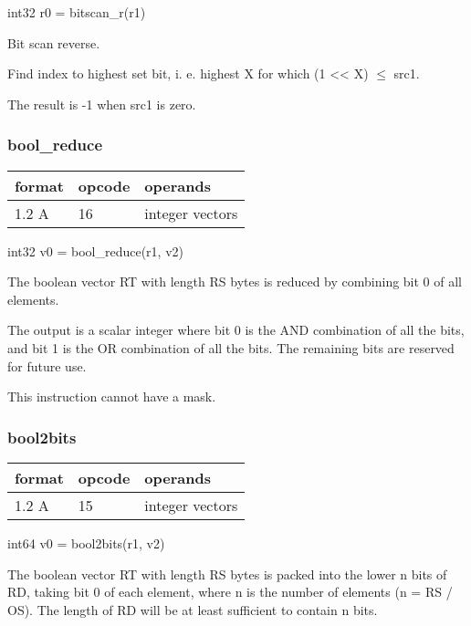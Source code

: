 \documentclass[forwardcom.tex]{subfiles}
\begin{document}
int32 r0 = bitscan\_r(r1)
\vspace{2mm}

Bit scan reverse. 
\vspace{2mm}

Find index to highest set bit, i. e. highest X for which (1 \textless\textless{} X) $\leq$ src1.
\vspace{2mm}

The result is -1 when src1 is zero.

\subsubsection{bool\_reduce}
\label{table:boolReduceInstruction}
\begin{tabular}{|p{12mm}|p{12mm}|p{110mm}|}
\hline
\bfseries format & \bfseries opcode & \bfseries operands \\ \hline
1.2 A & 16 & integer vectors \\ \hline
\end{tabular}
\vspace{2mm}

int32 v0 = bool\_reduce(r1, v2)
\vspace{2mm}

The boolean vector RT with length RS bytes is reduced by combining bit 0 of all elements.

The output is a scalar integer where bit 0 is the AND combination of all the bits, and bit
1 is the OR combination of all the bits. The remaining bits are reserved for future use.
\vspace{2mm}

This instruction cannot have a mask.


\subsubsection{bool2bits}
\label{table:bool2bitsInstruction}
\begin{tabular}{|p{12mm}|p{12mm}|p{110mm}|}
\hline
\bfseries format & \bfseries opcode & \bfseries operands \\ \hline
1.2 A & 15 & integer vectors \\ \hline
\end{tabular}
\vspace{2mm}

int64 v0 = bool2bits(r1, v2)
\vspace{2mm}

The boolean vector RT with length RS bytes is packed into the lower n bits of RD, taking bit 0 of each element, where n is the number of elements (n = RS / OS). 
The length of RD will be at least sufficient to contain n bits.
\vspace{2mm}
\end{document}
